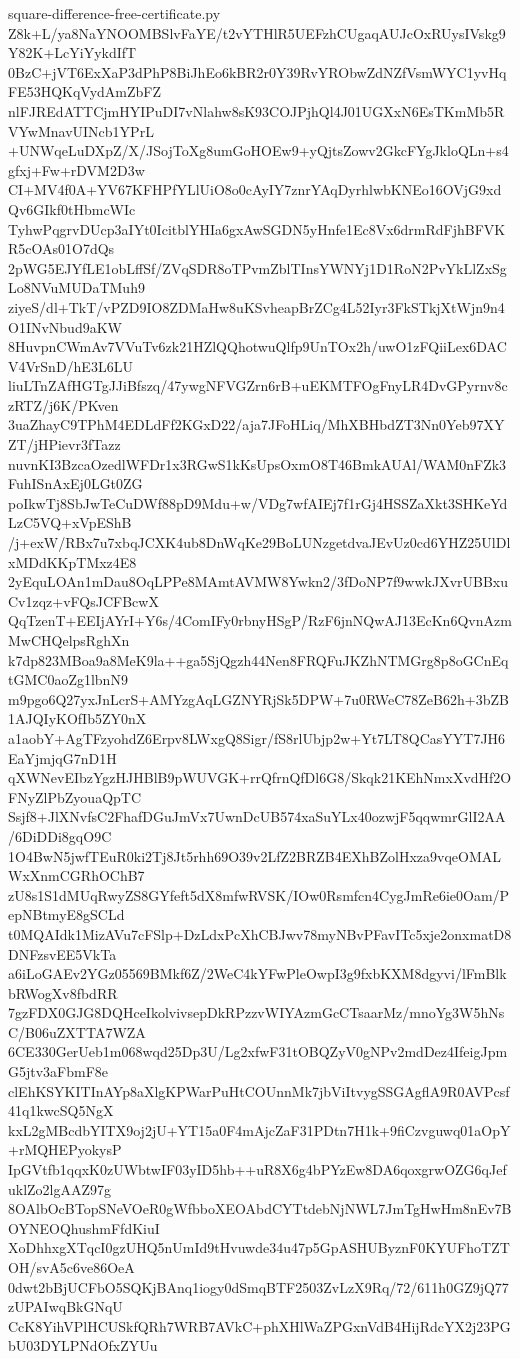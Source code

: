 \documentclass[11pt]{article}
\theoremstyle{definition}
\theoremstyle{remark}
\begin{document}
\begin{filecontents*}[overwrite]{square-difference-free-certificate.py}
Z8k+L/ya8NaYNOOMBSlvFaYE/t2vYTHlR5UEFzhCUgaqAUJcOxRUysIVskg9Y82K+LcYiYykdIfT
0BzC+jVT6ExXaP3dPhP8BiJhEo6kBR2r0Y39RvYRObwZdNZfVsmWYC1yvHqFE53HQKqVydAmZbFZ
nlFJREdATTCjmHYIPuDI7vNlahw8sK93COJPjhQl4J01UGXxN6EsTKmMb5RVYwMnavUINcb1YPrL
+UNWqeLuDXpZ/X/JSojToXg8umGoHOEw9+yQjtsZowv2GkcFYgJkloQLn+s4gfxj+Fw+rDVM2D3w
CI+MV4f0A+YV67KFHPfYLlUiO8o0cAyIY7znrYAqDyrhlwbKNEo16OVjG9xdQv6GIkf0tHbmcWIc
TyhwPqgrvDUcp3aIYt0IcitblYHIa6gxAwSGDN5yHnfe1Ec8Vx6drmRdFjhBFVKR5cOAs01O7dQs
2pWG5EJYfLE1obLffSf/ZVqSDR8oTPvmZblTInsYWNYj1D1RoN2PvYkLlZxSgLo8NVuMUDaTMuh9
ziyeS/dl+TkT/vPZD9IO8ZDMaHw8uKSvheapBrZCg4L52Iyr3FkSTkjXtWjn9n4O1INvNbud9aKW
8HuvpnCWmAv7VVuTv6zk21HZlQQhotwuQlfp9UnTOx2h/uwO1zFQiiLex6DACV4VrSnD/hE3L6LU
liuLTnZAfHGTgJJiBfszq/47ywgNFVGZrn6rB+uEKMTFOgFnyLR4DvGPyrnv8czRTZ/j6K/PKven
3uaZhayC9TPhM4EDLdFf2KGxD22/aja7JFoHLiq/MhXBHbdZT3Nn0Yeb97XYZT/jHPievr3fTazz
nuvnKI3BzcaOzedlWFDr1x3RGwS1kKsUpsOxmO8T46BmkAUAl/WAM0nFZk3FuhISnAxEj0LGt0ZG
poIkwTj8SbJwTeCuDWf88pD9Mdu+w/VDg7wfAIEj7f1rGj4HSSZaXkt3SHKeYdLzC5VQ+xVpEShB
/j+exW/RBx7u7xbqJCXK4ub8DnWqKe29BoLUNzgetdvaJEvUz0cd6YHZ25UlDlxMDdKKpTMxz4E8
2yEquLOAn1mDau8OqLPPe8MAmtAVMW8Ywkn2/3fDoNP7f9wwkJXvrUBBxuCv1zqz+vFQsJCFBcwX
QqTzenT+EEIjAYrI+Y6s/4ComIFy0rbnyHSgP/RzF6jnNQwAJ13EcKn6QvnAzmMwCHQelpsRghXn
k7dp823MBoa9a8MeK9la++ga5SjQgzh44Nen8FRQFuJKZhNTMGrg8p8oGCnEqtGMC0aoZg1lbnN9
m9pgo6Q27yxJnLcrS+AMYzgAqLGZNYRjSk5DPW+7u0RWeC78ZeB62h+3bZB1AJQIyKOfIb5ZY0nX
a1aobY+AgTFzyohdZ6Erpv8LWxgQ8Sigr/fS8rlUbjp2w+Yt7LT8QCasYYT7JH6EaYjmjqG7nD1H
qXWNevEIbzYgzHJHBlB9pWUVGK+rrQfrnQfDl6G8/Skqk21KEhNmxXvdHf2OFNyZlPbZyouaQpTC
Ssjf8+JlXNvfsC2FhafDGuJmVx7UwnDcUB574xaSuYLx40ozwjF5qqwmrGlI2AA/6DiDDi8gqO9C
1O4BwN5jwfTEuR0ki2Tj8Jt5rhh69O39v2LfZ2BRZB4EXhBZolHxza9vqeOMALWxXnmCGRhOChB7
zU8s1S1dMUqRwyZS8GYfeft5dX8mfwRVSK/IOw0Rsmfcn4CygJmRe6ie0Oam/PepNBtmyE8gSCLd
t0MQAIdk1MizAVu7cFSlp+DzLdxPcXhCBJwv78myNBvPFavITc5xje2onxmatD8DNFzsvEE5VkTa
a6iLoGAEv2YGz05569BMkf6Z/2WeC4kYFwPleOwpI3g9fxbKXM8dgyvi/lFmBlkbRWogXv8fbdRR
7gzFDX0GJG8DQHceIkolvivsepDkRPzzvWIYAzmGcCTsaarMz/mnoYg3W5hNsC/B06uZXTTA7WZA
6CE330GerUeb1m068wqd25Dp3U/Lg2xfwF31tOBQZyV0gNPv2mdDez4IfeigJpmG5jtv3aFbmF8e
clEhKSYKITInAYp8aXlgKPWarPuHtCOUnnMk7jbViItvygSSGAgflA9R0AVPcsf41q1kwcSQ5NgX
kxL2gMBcdbYITX9oj2jU+YT15a0F4mAjcZaF31PDtn7H1k+9fiCzvguwq01aOpY+rMQHEPyokysP
IpGVtfb1qqxK0zUWbtwIF03yID5hb++uR8X6g4bPYzEw8DA6qoxgrwOZG6qJefuklZo2lgAAZ97g
8OAlbOcBTopSNeVOeR0gWfbboXEOAbdCYTtdebNjNWL7JmTgHwHm8nEv7BOYNEOQhushmFfdKiuI
XoDhhxgXTqcI0gzUHQ5nUmId9tHvuwde34u47p5GpASHUByznF0KYUFhoTZTOH/svA5c6ve86OeA
0dwt2bBjUCFbO5SQKjBAnq1iogy0dSmqBTF2503ZvLzX9Rq/72/611h0GZ9jQ77zUPAIwqBkGNqU
CcK8YihVPlHCUSkfQRh7WRB7AVkC+phXHlWaZPGxnVdB4HijRdcYX2j23PGbU03DYLPNdOfxZYUu

\end{filecontents*}
\end{document}
